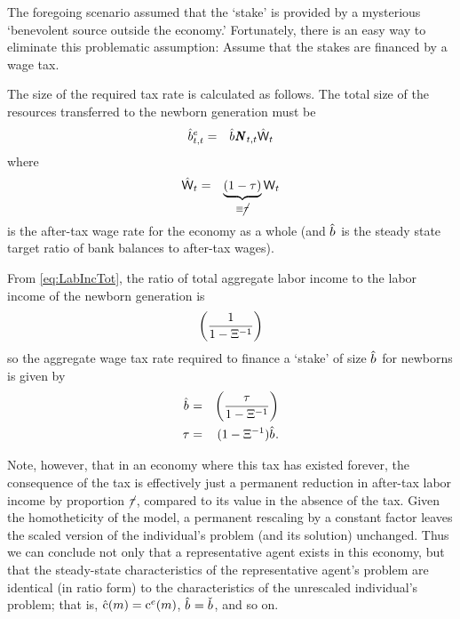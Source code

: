 \message{ !name(TractableBufferStock.tex)}\documentclass{handout}
\begin{document}
The foregoing scenario assumed that the `stake' is provided by a mysterious
`benevolent source outside the economy.'  Fortunately, there is an
easy way to eliminate this problematic assumption: Assume that the
stakes are financed by a wage tax.

The size of the required tax rate is calculated as follows.  The total size
of the resources transferred to the newborn generation must be
\begin{eqnarray}
  \hat{\bRat}^{e}_{t,t} & = & \hat{\bRat}^{\null} \PopLev_{t,t} \hat{\Wage}_{t}
\end{eqnarray}
where
\begin{eqnarray}
  \hat{\mathsf{W}}_{t} & = & \underbrace{\left(1-\tau \right)}_{\equiv \cancel{\tau}}\mathsf{W}_{t}
\end{eqnarray}
is the after-tax wage rate for the economy as a whole (and $\hat{b}^{\null}$ is the steady state target ratio of bank balances to after-tax wages).

From \eqref{eq:LabIncTot}, the ratio of total aggregate labor income 
to the labor income of the newborn generation is 
\begin{eqnarray}
  \left(\frac{1}{1-\Xi^{-1}}\right)
\end{eqnarray}
so the aggregate wage tax rate required to finance a `stake' of size $\hat{b}^{\null}$ for
newborns is given by 
\begin{eqnarray}
  \hat{b}^{\null} & = &   \left(\frac{\Tax}{1-\EmpGro^{-1}}\right)
\\ \Tax & = & (1-\EmpGro^{-1})\hat{b}^{\null}
.
\end{eqnarray}

Note, however, that in an economy where this tax has existed forever, the consequence
of the tax is effectively just a permanent reduction in after-tax labor income by proportion $\cancel{\tau}$, compared to its value in the absence of the tax.  
Given the homotheticity of the model, a permanent rescaling by a constant 
factor leaves the scaled version of the individual's problem (and its solution)
unchanged.  Thus we can conclude not only that a representative agent exists
in this economy, but that the steady-state characteristics of the 
representative agent's problem are identical (in ratio form) to the 
characteristics of the unrescaled individual's problem; that is, 
$\hat{\mathrm{c}}(m) = \mathrm{c}^{e}(m)$, $\hat{b}^{\null} = \bTarg^{\null}$, and so on.  
\end{document}
